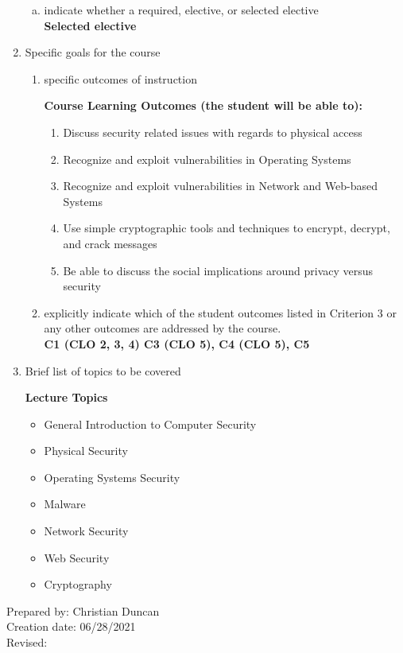 \begin{enumerate}[1.]
\begin{enumerate}[a.]
\item indicate whether a required, elective, or selected elective\\ %
  {\bfseries
    Selected elective
  }

\end{enumerate}

\item Specific goals for the course
\begin{enumerate}
\item specific outcomes of instruction\\ %
  {\bfseries
    Course Learning Outcomes (the student will be able to):
\begin{enumerate}
\item Discuss security related issues with regards to physical access
\item Recognize and exploit vulnerabilities in Operating Systems
\item Recognize and exploit vulnerabilities in Network and Web-based Systems
\item Use simple cryptographic tools and techniques to encrypt, decrypt, and
crack messages
\item Be able to discuss the social implications around privacy versus security
\end{enumerate}
  }

\item explicitly indicate which of the student outcomes listed in Criterion 3 or any other outcomes are addressed by the course.\\
  {\bfseries
    C1 (CLO 2, 3, 4)
    C3 (CLO 5),
    C4 (CLO 5),
    C5
  }
\end{enumerate}

\item Brief list of topics to be covered\\
  {\bfseries
    Lecture Topics
    \begin{itemize}
    \item General Introduction to Computer Security
    \item Physical Security
    \item Operating Systems Security
    \item Malware
    \item Network Security
    \item Web Security
    \item Cryptography
    \end{itemize}
  }

\end{enumerate}

\noindent Prepared by: Christian Duncan\\
\noindent Creation date: 06/28/2021\\
\noindent Revised:\\
